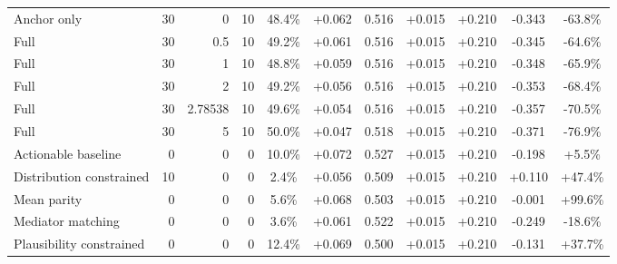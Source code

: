 \begin{table}[htbp]
\begin{tabular}{lrrrccccccc}
Anchor only & 30 & 0 & 10 & 48.4\% & +0.062 & 0.516 & +0.015 & +0.210 & -0.343 & -63.8\% \\
Full & 30 & 0.5 & 10 & 49.2\% & +0.061 & 0.516 & +0.015 & +0.210 & -0.345 & -64.6\% \\
Full & 30 & 1 & 10 & 48.8\% & +0.059 & 0.516 & +0.015 & +0.210 & -0.348 & -65.9\% \\
Full & 30 & 2 & 10 & 49.2\% & +0.056 & 0.516 & +0.015 & +0.210 & -0.353 & -68.4\% \\
Full & 30 & 2.78538 & 10 & 49.6\% & +0.054 & 0.516 & +0.015 & +0.210 & -0.357 & -70.5\% \\
Full & 30 & 5 & 10 & 50.0\% & +0.047 & 0.518 & +0.015 & +0.210 & -0.371 & -76.9\% \\
Actionable baseline & 0 & 0 & 0 & 10.0\% & +0.072 & 0.527 & +0.015 & +0.210 & -0.198 & +5.5\% \\
Distribution constrained & 10 & 0 & 0 & 2.4\% & +0.056 & 0.509 & +0.015 & +0.210 & +0.110 & +47.4\% \\
Mean parity & 0 & 0 & 0 & 5.6\% & +0.068 & 0.503 & +0.015 & +0.210 & -0.001 & +99.6\% \\
Mediator matching & 0 & 0 & 0 & 3.6\% & +0.061 & 0.522 & +0.015 & +0.210 & -0.249 & -18.6\% \\
Plausibility constrained & 0 & 0 & 0 & 12.4\% & +0.069 & 0.500 & +0.015 & +0.210 & -0.131 & +37.7\% \\
\bottomrule
\end{tabular}
\end{table}